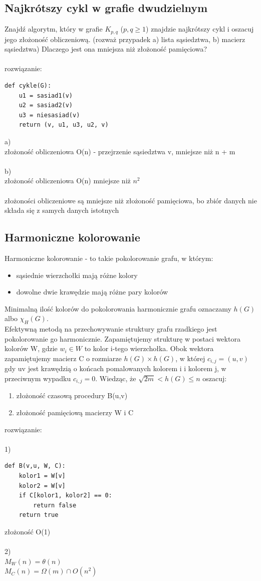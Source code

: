 \documentclass{article}
\begin{document}
\subsection*{Najkrótszy cykl w grafie dwudzielnym}
Znajdź algorytm,  który w grafie $K_{p,q}$ ($p,q \ge 1$) znajdzie najkrótszy cykl i oszacuj jego złożoność obliczeniową.  
(rozważ przypadek a) lista sąsiedztwa, b) macierz sąsiedztwa)
Dlaczego jest ona mniejsza niż złożoność pamięciowa? \\\\rozwiązanie:\\
\begin{lstlisting}
def cykle(G):
	u1 = sasiad1(v)
	u2 = sasiad2(v)
	u3 = niesasiad(v)
	return (v, u1, u3, u2, v)
\end{lstlisting}
a)\\
złożoność obliczeniowa O(n) - przejrzenie sąsiedztwa v,  mniejsze niż n + m \\\\
b)\\
złożoność obliczeniowa O(n) mniejsze niż $n^2$ \\\\
złożoności obliczeniowe są mniejsze niż złożoność pamięciowa, bo zbiór danych nie składa się z samych danych istotnych

\subsection*{Harmoniczne kolorowanie}
Harmoniczne kolorowanie - to takie pokolorowanie grafu,  w którym:
\begin{itemize}
	\item sąsiednie wierzchołki mają różne kolory
	\item dowolne dwie krawędzie mają różne pary kolorów
\end{itemize}
Minimalną ilość kolorów do pokolorowania harmonicznie grafu oznaczamy $h(G)$ albo $\chi_H(G)$.  \\
Efektywną metodą na przechowywanie struktury grafu rzadkiego jest pokolorowanie go harmonicznie. 
Zapamiętujemy strukturę w postaci wektora kolorów W, gdzie $w_i \in W$ to kolor i-tego wierzchołka.
Obok wektora zapamiętujemy macierz C o rozmiarze $h(G) \times h(G)$, w której $c_{i,j} = (u,v)$ gdy uv
jest krawędzią o końcach pomalowanych kolorem i i kolorem j, w przeciwnym wypadku $c_{i,j} = 0$. 
Wiedząc, że $\sqrt{2m} < h(G) \leq n$ oszacuj:
\begin{enumerate}
	\item złożoność czasową procedury B(u,v) 
	\item złożoność pamięciową macierzy W i C
\end{enumerate}
rozwiązanie: \\\\
1)
\begin{lstlisting}
def B(v,u, W, C):
	kolor1 = W[v]
	kolor2 = W[v]
	if C[kolor1, kolor2] == 0:
		return false
	return true	
\end{lstlisting}
złożoność O(1) \\\\
2)\\
$M_W(n) = \theta(n)$ \\
$M_C(n) = \Omega(m) \cap O(n^2)$
\end{document}
